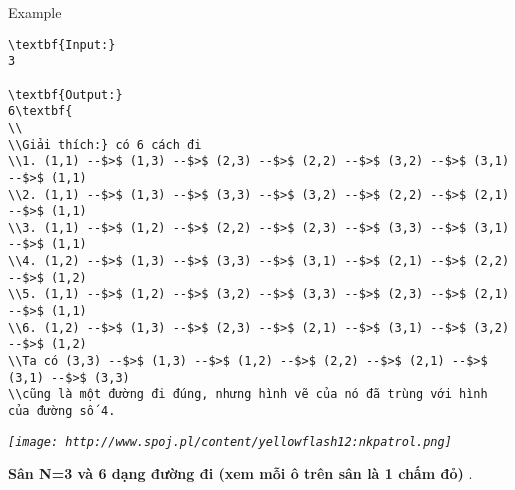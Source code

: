 Example
\begin{verbatim}
\textbf{Input:}
3

\textbf{Output:}
6\textbf{
\\
\\Giải thích:} có 6 cách đi
\\1. (1,1) --$>$ (1,3) --$>$ (2,3) --$>$ (2,2) --$>$ (3,2) --$>$ (3,1) --$>$ (1,1)
\\2. (1,1) --$>$ (1,3) --$>$ (3,3) --$>$ (3,2) --$>$ (2,2) --$>$ (2,1) --$>$ (1,1)
\\3. (1,1) --$>$ (1,2) --$>$ (2,2) --$>$ (2,3) --$>$ (3,3) --$>$ (3,1) --$>$ (1,1)
\\4. (1,2) --$>$ (1,3) --$>$ (3,3) --$>$ (3,1) --$>$ (2,1) --$>$ (2,2) --$>$ (1,2)
\\5. (1,1) --$>$ (1,2) --$>$ (3,2) --$>$ (3,3) --$>$ (2,3) --$>$ (2,1) --$>$ (1,1)
\\6. (1,2) --$>$ (1,3) --$>$ (2,3) --$>$ (2,1) --$>$ (3,1) --$>$ (3,2) --$>$ (1,2)
\\Ta có (3,3) --$>$ (1,3) --$>$ (1,2) --$>$ (2,2) --$>$ (2,1) --$>$ (3,1) --$>$ (3,3) 
\\cũng là một đường đi đúng, nhưng hình vẽ của nó đã trùng với hình của đường số 4.\end{verbatim}

\emph{
\texttt{[image: http://www.spoj.pl/content/yellowflash12:nkpatrol.png]}}

\textbf{    Sân N=3 và 6 dạng đường đi (xem mỗi ô trên sân là 1 chấm đỏ)   }   .